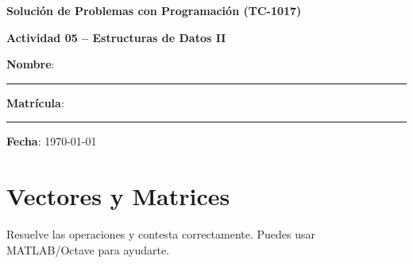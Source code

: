 \documentclass[spanish, 10pt]{article}
\begin{document}
\begin{center}
	{\Large \textbf{Solución de Problemas con Programación (TC-1017)}}
	
	\bigskip
	{\large \textbf{Actividad 05 -- Estructuras de Datos II}}
\end{center}

\bigskip
{\large \textbf{Nombre}: \rule{13.7 cm}{0.4mm}}



\bigskip
{\large \textbf{Matrícula}: \rule{5 cm}{0.4mm}} \hfill {\large \textbf{Fecha}: \today}

\bigskip


\section{Vectores y Matrices}

Resuelve las operaciones y contesta correctamente. Puedes usar MATLAB/Octave para ayudarte.
\end{document}
